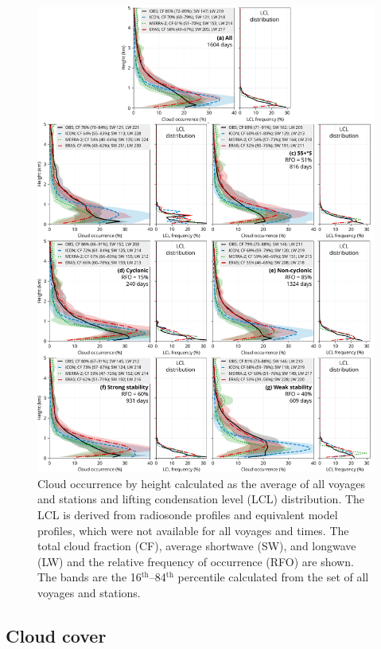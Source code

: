 \documentclass[draft]{agujournal2019}
\begin{document}
\begin{figure}[p!]
\centering
\includegraphics[width=\textwidth]{img/cl_agg.pdf}
\caption{
Cloud occurrence by height calculated as the average of all voyages and stations and lifting condensation level (LCL) distribution. The LCL is derived from radiosonde profiles and equivalent model profiles, which were not available for all voyages and times. The total cloud fraction (CF), average shortwave (SW), and longwave (LW) and the relative frequency of occurrence (RFO) are shown. The bands are the 16$^\mathrm{th}$--84$^\mathrm{th}$ percentile calculated from the set of all voyages and stations.
}
\label{fig:cloud-occurrence}
\end{figure}

\subsection{Cloud cover}
\label{sec:cloud-cover}
\end{document}
